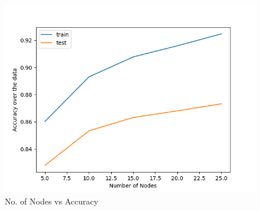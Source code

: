 \documentclass[11pt]{article}
\begin{document}
\begin{figure}[H]
  \includegraphics[width=\linewidth]{nn_b_plot.png}
  \caption{No. of Nodes vs Accuracy}
  \label{fig1B}
\end{figure}
\\
\end{document}
